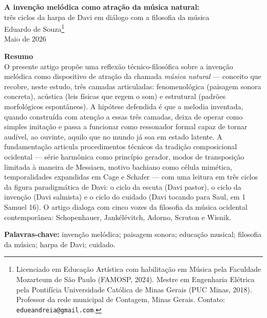 \documentclass[12pt,a4paper]{article}
\begin{document}
\begin{center}
{\Large\bfseries A invenção melódica como atração da música natural:}\\[0.5em]
{\large três ciclos da harpa de Davi em diálogo com a filosofia da música}\\[1.5em]
{Eduardo de Souza\footnote{Licenciado em Educação Artística com habilitação em Música pela Faculdade Mozarteum de São Paulo (FAMOSP, 2024). Mestre em Engenharia Elétrica pela Pontifícia Universidade Católica de Minas Gerais (PUC Minas, 2018). Professor da rede municipal de Contagem, Minas Gerais. Contato: \texttt{edueandreia@gmail.com}.}}\\[0.5em]
{\small Maio de 2026}
\end{center}

\vspace{1em}

\noindent\textbf{Resumo}\\[0.5em]
{\small\noindent O presente artigo propõe uma reflexão técnico-filosófica sobre a invenção melódica como dispositivo de atração da chamada \textit{música natural} --- conceito que recobre, neste estudo, três camadas articuladas: fenomenológica (paisagem sonora concreta), acústica (leis físicas que regem o som) e estrutural (padrões morfológicos espontâneos). A hipótese defendida é que a melodia inventada, quando construída com atenção a essas três camadas, deixa de operar como simples imitação e passa a funcionar como ressonador formal capaz de tornar audível, ao ouvinte, aquilo que no mundo já soa em estado latente. A fundamentação articula procedimentos técnicos da tradição composicional ocidental --- série harmônica como princípio gerador, modos de transposição limitada à maneira de Messiaen, motivo bachiano como célula mimética, temporalidades expandidas em Cage e Schafer --- com uma leitura em três ciclos da figura paradigmática de Davi: o ciclo da escuta (Davi pastor), o ciclo da invenção (Davi salmista) e o ciclo do cuidado (Davi tocando para Saul, em 1 Samuel 16). O artigo dialoga com cinco vozes da filosofia da música ocidental contemporânea: Schopenhauer, Jankélévitch, Adorno, Scruton e Wisnik.}

\vspace{0.5em}
\noindent\textbf{Palavras-chave:} invenção melódica; paisagem sonora; educação musical; filosofia da música; harpa de Davi; cuidado.

\vspace{0.5em}
\end{document}
